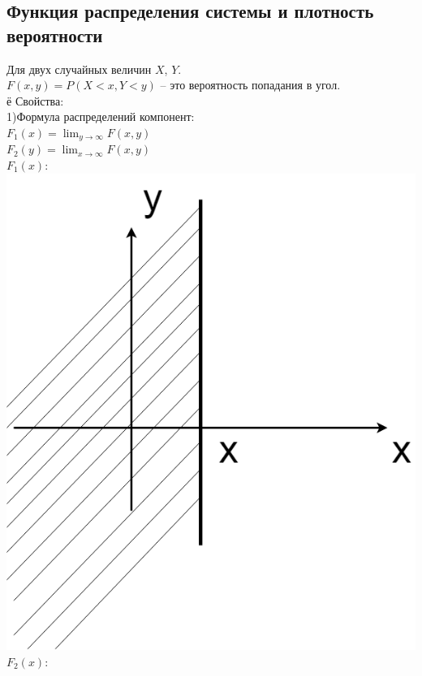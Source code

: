 \documentclass[russian, 12pt, fleqn]{article}
\begin{document}
\subsection{Функция распределения системы и плотность вероятности}
Для двух случайных величин $X$, $Y$.\\
$F(x, y) = P(X<x, Y<y)$ -- это вероятность попадания в угол.\\
ё
Свойства:\\
1)Формула распределений компонент:\\
 $F_1(x) = \displaystyle{  \lim_{y\to{\infty}} F(x, y) }$ \\
 $F_2(y) = \displaystyle{  \lim_{x\to{\infty}} F(x, y) }$ \\
\newpage
$F_1(x):$\\
\includegraphics[scale=0.3]{pg30.png}\\	
$F_2(x):$\\
\end{document}
